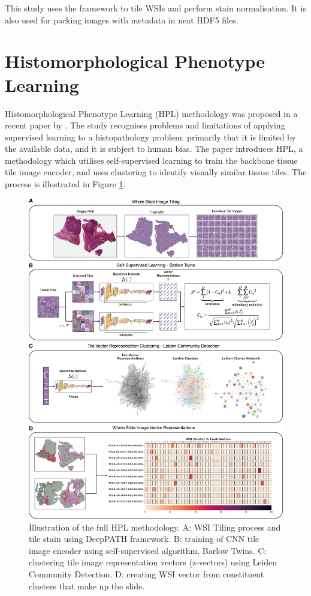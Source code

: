 \documentclass{l4proj}
\begin{document}
This study uses the framework to tile WSIs and perform stain normalisation. It is also used for packing images with metadata in neat HDF5 files.

\section{Histomorphological Phenotype Learning} \label{sec:HPL}
Histomorphological Phenotype Learning (HPL) methodology was proposed in a recent paper by \cite{ClaudioQuiros2024}. The study recognises problems and limitations of applying supervised learning to a histopathology problem: primarily that it is limited by the available data, and it is subject to human bias. The paper introduces HPL, a methodology which utilises self-supervised learning to train the backbone tissue tile image encoder, and uses clustering to identify visually similar tissue tiles. The process is illustrated in Figure \ref{fig:HPL}.

\begin{figure}
    \centering
    \includegraphics[width=1\linewidth]{images/HPL.png.jpg}
    \caption{Illustration of the full HPL methodology. A: WSI Tiling process and tile stain using DeepPATH framework. B: training of CNN tile image encoder using self-supervised algorithm, Barlow Twins. C: clustering tile image representation vectors (z-vectors) using Leiden Community Detection. D: creating WSI vector from constituent clusters that make up the slide. \citep{ClaudioQuiros2024}}
    \label{fig:HPL}
\end{figure}
\end{document}
